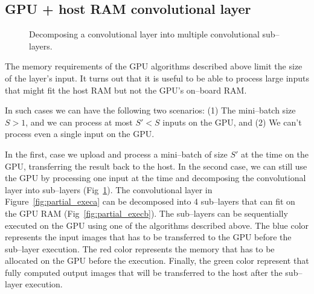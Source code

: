 \documentclass[conference]{IEEEtran}
\begin{document}
\subsection{GPU + host RAM convolutional layer}

  \begin{figure}
    \centering
    \caption{Decomposing a convolutional layer into multiple
      convolutional sub--layers.}
    \label{fig:partial_exec}
  \end{figure}

  The memory requirements of the GPU algorithms described above limit
  the size of the layer's input.  It turns out that it is useful to be
  able to process large inputs that might fit the host RAM but not the
  GPU's on--board RAM.

  In such cases we can have the following two scenarios: (1) The
  mini--batch size $S > 1$, and we can process at most $S' < S$ inputs
  on the GPU, and (2) We can't process even a single input on the GPU.

  In the first, case we upload and process a mini--batch of size $S'$
  at the time on the GPU, transferring the result back to the host.
  In the second case, we can still use the GPU by processing one input
  at the time and decomposing the convolutional layer into sub--layers
  (Fig~\ref{fig:partial_exec}). The convolutional layer in
  Figure~\ref{fig:partial_execa} can be decomposed into 4 sub--layers
  that can fit on the GPU RAM (Fig~\ref{fig:partial_execb}). The
  sub--layers can be sequentially executed on the GPU using one of the
  algorithms described above.  The blue color represents the input
  images that has to be transferred to the GPU before the sub--layer
  execution.  The red color represents the memory that has to be
  allocated on the GPU before the execution.  Finally, the green color
  represent that fully computed output images that will be transferred
  to the host after the sub--layer execution.
\end{document}

